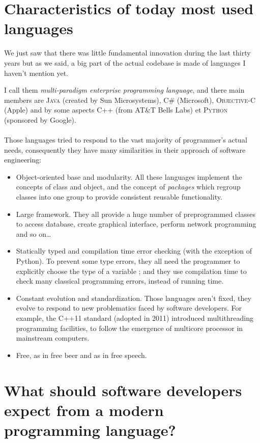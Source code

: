 \documentclass[a4paper]{article}
\newcommand{\cpp}{%
\textsc{C++}%
}
\begin{document}
\section{Characteristics of today most used languages}
 
We just saw that there was little fundamental innovation during the last thirty years but as we said, a big part of the actual codebase is made of languages I haven't mention yet.

I call them \emph{multi-paradigm enterprise programming language}, and there main members are \textsc{Java} (created by Sun Microsystems), \textsc{C\#} (Microsoft), \textsc{Objective-C} (Apple) and by some aspects \cpp (from AT\&T Bells Labs) et \textsc{Python} (sponsored by Google).

\paragraph{}
Those languages tried to respond to the vast majority of programmer's actual needs, consequently they have many similarities in their approach of software engineering:
\begin{itemize}
\item
Object-oriented base and modularity. All these languages implement the concepts of class and object, and the concept of \emph{packages} which regroup classes into one group to provide consistent reusable functionality.
\item
Large framework. They all provide a huge number of preprogrammed classes to access database, create graphical interface, perform network programming and so on\ldots
\item
Statically typed and compilation time error checking (with the exception of Python). To prevent some type errors, they all need the programmer to explicitly choose the type of a variable ; and they use compilation time to check many classical programming errors, instead of running time.
\item
Constant evolution and standardization. Those languages aren't fixed, they evolve to respond to new problematics faced by software developers. For example, the \textsf{C++11} standard (adopted in 2011) introduced multithreading programming facilities, to follow the emergence of multicore processor in mainstream computers. 
\item
Free, as in free beer and as in free speech.
\end{itemize}

\section{What should software developers expect from a modern programming language?}
\end{document}
